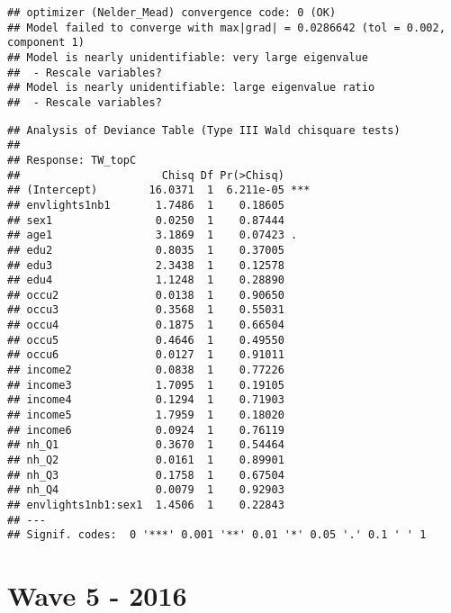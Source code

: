 \documentclass[
]{book}
\begin{document}
\begin{verbatim}
## optimizer (Nelder_Mead) convergence code: 0 (OK)
## Model failed to converge with max|grad| = 0.0286642 (tol = 0.002, component 1)
## Model is nearly unidentifiable: very large eigenvalue
##  - Rescale variables?
## Model is nearly unidentifiable: large eigenvalue ratio
##  - Rescale variables?
\end{verbatim}

\begin{verbatim}
## Analysis of Deviance Table (Type III Wald chisquare tests)
## 
## Response: TW_topC
##                      Chisq Df Pr(>Chisq)    
## (Intercept)        16.0371  1  6.211e-05 ***
## envlights1nb1       1.7486  1    0.18605    
## sex1                0.0250  1    0.87444    
## age1                3.1869  1    0.07423 .  
## edu2                0.8035  1    0.37005    
## edu3                2.3438  1    0.12578    
## edu4                1.1248  1    0.28890    
## occu2               0.0138  1    0.90650    
## occu3               0.3568  1    0.55031    
## occu4               0.1875  1    0.66504    
## occu5               0.4646  1    0.49550    
## occu6               0.0127  1    0.91011    
## income2             0.0838  1    0.77226    
## income3             1.7095  1    0.19105    
## income4             0.1294  1    0.71903    
## income5             1.7959  1    0.18020    
## income6             0.0924  1    0.76119    
## nh_Q1               0.3670  1    0.54464    
## nh_Q2               0.0161  1    0.89901    
## nh_Q3               0.1758  1    0.67504    
## nh_Q4               0.0079  1    0.92903    
## envlights1nb1:sex1  1.4506  1    0.22843    
## ---
## Signif. codes:  0 '***' 0.001 '**' 0.01 '*' 0.05 '.' 0.1 ' ' 1
\end{verbatim}

\hypertarget{wave-5---2016}{%
\section{Wave 5 - 2016}\label{wave-5---2016}}
\end{document}
